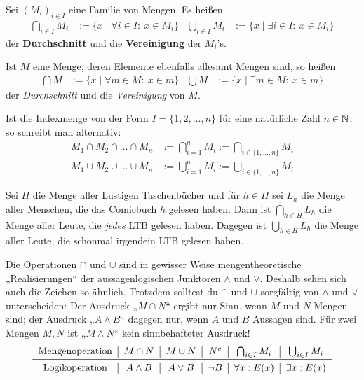 \begin{de} \label{def:mehrfachcapcup}
    Sei $(M_i)_{i\in I}$ eine Familie von Mengen. Es heißen
    \begin{align*}
        \bigcap_{i\in I} M_i &:= \{x \mid \forall i\in I:\ x\in M_i\} & \bigcup_{i\in I}M_i &:= \{x \mid \exists i\in I:\ x\in M_i\}
    \end{align*}
    der \textbf{Durchschnitt} und die \textbf{Vereinigung} der $M_i$'s.
    
    Ist $M$ eine Menge, deren Elemente ebenfalls allesamt Mengen sind, so heißen
    \begin{align*}
        \bigcap M & := \{ x \mid \forall m\in M:\ x\in m \} & \bigcup M & := \{x\mid \exists m\in M:\ x\in m \}
    \end{align*}
    der \emph{Durchschnitt} und die \emph{Vereinigung} von $M$.
\end{de}


\begin{nota} \label{alternativmehrfachcapcup}
    Ist die Indexmenge von der Form $I=\{1,2,\dots,n\}$ für eine natürliche Zahl $n\in \mathbb N$, so schreibt man alternativ:
    \begin{align*}
        M_1\cap M_2\cap\ldots\cap M_n & := \bigcap_{i=1}^n M_i := \bigcap_{i\in \{1,\dots , n\}} M_i\\
        M_1\cup M_2\cup\ldots\cup M_n & := \bigcup_{i=1}^n M_i := \bigcup_{i\in \{1,\dots , n\}} M_i
    \end{align*}
\end{nota}


\begin{bsp}
    Sei $H$ die Menge aller Lustigen Taschenbücher und für $h\in H$ sei $L_h$ die Menge aller Menschen, die das Comicbuch $h$ gelesen haben. Dann ist $\bigcap_{h\in H} L_h$ die Menge aller Leute, die \emph{jedes} LTB gelesen haben. Dagegen ist $\bigcup_{h\in H} L_h$ die Menge aller Leute, die schonmal irgendein LTB gelesen haben.
\end{bsp}


\begin{bem}
    Die Operationen $\cap$ und $\cup$ sind in gewisser Weise mengentheoretische „Realisierungen“ der aussagenlogischen Junktoren $\land$ und $\lor$. Deshalb sehen sich auch die Zeichen so ähnlich. Trotzdem solltest du $\cap$ und $\cup$ sorgfältig von $\land$ und $\lor$ unterscheiden: Der Ausdruck „$M\cap N$“ ergibt nur Sinn, wenn $M$ und $N$ Mengen sind; der Ausdruck „$A\wedge B$“ dagegen nur, wenn $A$ und $B$ Aussagen sind. Für zwei Mengen $M,N$ ist „$M\land N$“ kein sinnbehafteter Ausdruck!
    \[\begin{tabular}{c|c|c|c|c|c}
        Mengenoperation & $M\cap N$ & $M\cup N$ & $N^c$ & $\bigcap_{i\in I} M_i$ & $\bigcup_{i\in I} M_i$ \\ \midrule
        Logikoperation & $A\land B$ & $A \lor B$ & $\neg B$ & $\forall x: E(x)$ & $\exists x: E(x)$
    \end{tabular}\]
\end{bem}


